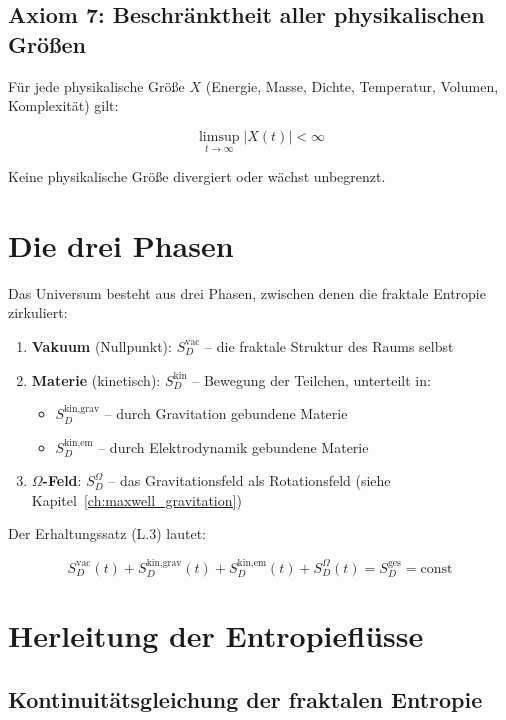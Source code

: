 \subsection{Axiom 7: Beschränktheit aller physikalischen Größen}
\label{sub:fraktale_entropie_axiom7}

Für jede physikalische Größe $X$ (Energie, Masse, Dichte, Temperatur, Volumen, 
Komplexität) gilt:

\[
\limsup_{t \to \infty} |X(t)| < \infty \tag{L.7}
\]

Keine physikalische Größe divergiert oder wächst unbegrenzt.

\section{Die drei Phasen}
\label{app:fraktale_entropie_phasen}

Das Universum besteht aus drei Phasen, zwischen denen die fraktale Entropie zirkuliert:

\begin{enumerate}
    \item \textbf{Vakuum} (Nullpunkt): $S_D^{\text{vac}}$ – die fraktale Struktur des Raums selbst
    \item \textbf{Materie} (kinetisch): $S_D^{\text{kin}}$ – Bewegung der Teilchen, unterteilt in:
          \begin{itemize}
              \item $S_D^{\text{kin,grav}}$ – durch Gravitation gebundene Materie
              \item $S_D^{\text{kin,em}}$ – durch Elektrodynamik gebundene Materie
          \end{itemize}
    \item \textbf{$\Omega$-Feld}: $S_D^{\Omega}$ – das Gravitationsfeld als Rotationsfeld (siehe Kapitel~\ref{ch:maxwell_gravitation})
\end{enumerate}

Der Erhaltungssatz (L.3) lautet:

\[
S_D^{\text{vac}}(t) + S_D^{\text{kin,grav}}(t) + S_D^{\text{kin,em}}(t) + S_D^{\Omega}(t) = S_D^{\text{ges}} = \text{const} \tag{L.8}
\]

\section{Herleitung der Entropieflüsse}
\label{app:fraktale_entropie_fluesse}

\subsection{Kontinuitätsgleichung der fraktalen Entropie}
\label{sub:fraktale_entropie_kontinuitaet}


